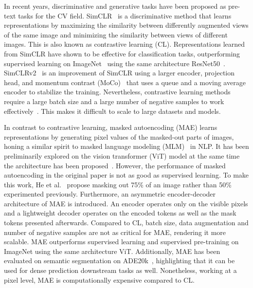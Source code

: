 \documentclass[a4paper,11pt,oneside]{report}
\begin{document}
In recent years, discriminative and generative tasks have been proposed as pre-text tasks for the CV field. SimCLR~\cite{Chen2020Simple} is a discriminative method that learns representations by maximizing the similarity between differently augmented views of the same image and minimizing the similarity between views of different images. This is also known as contrastive learning (CL). Representations learned from SimCLR have shown to be effective for classification tasks, outperforming supervised learning on ImageNet~\cite{Russakovsky2015} using the same architecture ResNet50~\cite{He2016}. SimCLRv2~\cite{Chen2020} is an improvement of SimCLR using a larger encoder, projection head, and momentum contrast (MoCo)~\cite{He2020} that uses a queue and a moving average encoder to stabilize the training. Nevertheless, contrastive learning methods require a large batch size and a large number of negative samples to work effectively~\cite{Chen2020Simple}. This makes it difficult to scale to large datasets and models. 

In contrast to contrastive learning, masked autoencoding (MAE) learns representations by generating pixel values of the masked-out parts of images, honing a similar spirit to masked language modeling (MLM)~\cite{Devlin2019} in NLP. It has been preliminarily explored on the vision transformer (ViT) model at the same time the architecture has been proposed~\cite{Dosovitskiy2020vit}. However, the performance of masked autoencoding in the original paper is not as good as supervised learning. To make this work, He et al.~\cite{He2022} propose masking out 75\% of an image rather than 50\% experimented previously. Furthermore, an asymmetric encoder-decoder architecture of MAE is introduced. An encoder operates only on the visible pixels and a lightweight decoder operates on the encoded tokens as well as the mask tokens presented afterwards. Compared to CL, batch size, data augmentation and number of negative samples are not as critical for MAE, rendering it more scalable. MAE outperforms supervised learning and supervised pre-training on ImageNet using the same architecture ViT. Additionally, MAE has been evaluated on semantic segmentation on ADE20k~\cite{Zhou2018}, highlighting that it can be used for dense prediction downstream tasks as well. Nonetheless, working at a pixel level, MAE is computationally expensive compared to CL.
\end{document}
